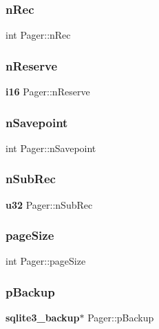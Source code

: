 \mbox{\label{struct_pager_a3a202368c065a43695533503c98f28d9}} 
\subsubsection{nRec}
{\footnotesize\ttfamily int Pager\+::n\+Rec}

\mbox{\label{struct_pager_a82581087240713cab679108e3adeaf58}} 
\subsubsection{nReserve}
{\footnotesize\ttfamily \textbf{ i16} Pager\+::n\+Reserve}

\mbox{\label{struct_pager_a020adae89ef6c1b28e51fffc3d4b22c9}} 
\subsubsection{nSavepoint}
{\footnotesize\ttfamily int Pager\+::n\+Savepoint}

\mbox{\label{struct_pager_a670c4c54515c0257c35ddfc07c43763e}} 
\subsubsection{nSubRec}
{\footnotesize\ttfamily \textbf{ u32} Pager\+::n\+Sub\+Rec}

\mbox{\label{struct_pager_a9cfb910e7eaf8442f5414d722232a6e9}} 
\subsubsection{pageSize}
{\footnotesize\ttfamily int Pager\+::page\+Size}

\mbox{\label{struct_pager_ae230d34da61bf28178fa1ac142a88c15}} 
\subsubsection{pBackup}
{\footnotesize\ttfamily \textbf{ sqlite3\+\_\+backup}$\ast$ Pager\+::p\+Backup}

\mbox{\label{struct_pager_a7a685e7a8dcbcd725c5a982fd8deb91b}} 
